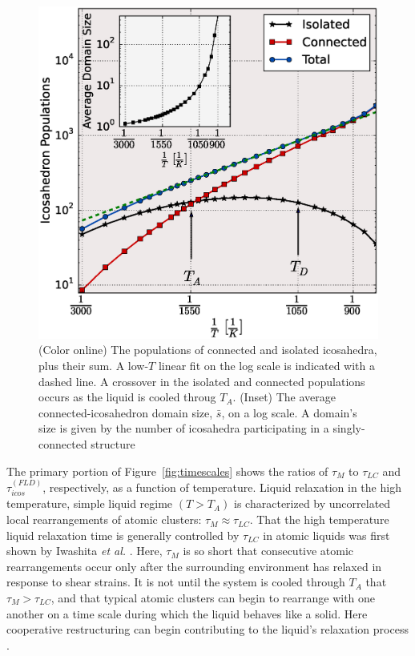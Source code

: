 \documentclass[aps,prl,preprint,showpacs,amsmath,floatfix,superscriptaddress]{revtex4}
\begin{document}
\begin{figure}[t]
\includegraphics[scale=0.38]{icos_pops.eps}
\caption{(Color online) The populations of connected and isolated
icosahedra, plus their sum. A low-$T$ linear fit on the log scale
is indicated with a dashed line. A crossover in the isolated and
connected populations occurs as the liquid is cooled throug $T_{A}$.
(Inset) The average
connected-icosahedron domain size, $\bar s$, on a log scale.
A domain's size is given by the number of icosahedra participating
in a singly-connected structure} \label{fig:icos_pop}
\end{figure}

The primary portion of Figure~\ref{fig:timescales} shows the
ratios of $\tau_{M}$ to $\tau_{LC}$ and $\tau^{(FLD)}_{icos}$,
respectively, as a function of temperature. Liquid relaxation in
the high temperature, simple liquid regime $(T>T_{A})$ is
characterized by uncorrelated local rearrangements of atomic
clusters: $\tau_{M} \approx \tau_{LC}$. That the high temperature
liquid relaxation time is generally controlled by $\tau_{LC}$ in
atomic liquids was first shown by Iwashita \textit{et al.}
\cite{Iwashita2013}. Here, $\tau_{M}$ is so short that consecutive
atomic rearrangements occur only after the surrounding environment
has relaxed in response to shear strains. It is not until the
system is cooled through $T_{A}$ that $\tau_{M} > \tau_{LC}$, and
that typical atomic clusters can begin to rearrange with one
another on a time scale during which the liquid behaves like a
solid. Here cooperative restructuring can begin contributing to
the liquid's relaxation process \cite{Iwashita2013}.
\end{document}
